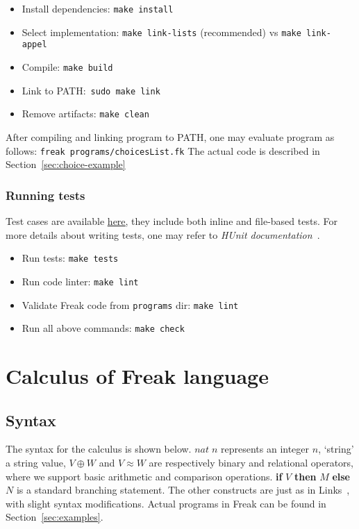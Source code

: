 \documentclass[declaration,shortabstract]{iithesis}
\theoremstyle{definition} \newtheorem{definition}{Definition}[chapter]
\theoremstyle{remark} \newtheorem{remark}[definition]{Observation}
\theoremstyle{plain} \newtheorem{theorem}[definition]{Theorem}
\theoremstyle{plain} \newtheorem{lemma}[definition]{Lemma}
\begin{document}
    \begin{itemize}
        \item Install dependencies: \verb!make install!
        \item Select implementation: \verb!make link-lists! (recommended) vs \verb!make link-appel!
        \item Compile: \verb!make build!
        \item Link to PATH:~\verb!sudo make link!
        \item Remove artifacts: \verb!make clean!
    \end{itemize}

    After compiling and linking program to PATH, one may evaluate program as
    follows: \verb!freak programs/choicesList.fk! The actual code is described in Section~\ref{sec:choice-example}

    \subsection{Running tests}

    Test cases are available \href{https://github.com/Tomatosoup97/freak/blob/master/src/Tests.hs}{\underline{here}},
    they include both inline and file-based tests. For more details about
    writing tests, one may refer to \textit{HUnit documentation}~\cite{hunit-docs}.

    \begin{itemize}
        \item Run tests: \verb!make tests!
        \item Run code linter: \verb!make lint!
        \item Validate Freak code from \verb!programs! dir: \verb!make lint!
        \item Run all above commands: \verb!make check!
    \end{itemize}

\chapter{Calculus of Freak language}\label{chapter:calculus-of-freak-language}
\section{Syntax}

    The syntax for the calculus is shown below. $nat \; n$ represents an integer $n$,
    `string' a string value, $V \oplus W$ and $V \approx W$ are respectively
    binary and relational operators, where we support basic arithmetic and
    comparison operations. \textbf{if} $V$ \textbf{then} $M$ \textbf{else} $N$
    is a standard branching statement. The other constructs are just as in
    Links~\cite{handlers-cps-journal}, with slight syntax modifications.
    Actual programs in Freak can be found in Section~\ref{sec:examples}.
\end{document}
